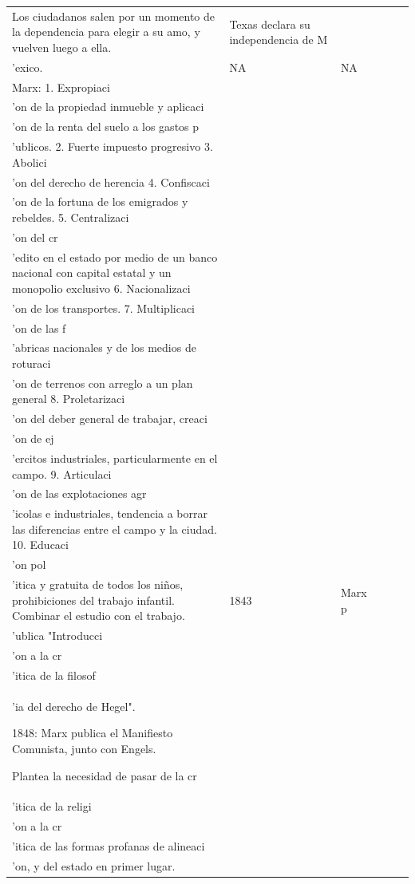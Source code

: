 \documentclass[
  letterpaper,
  DIV=11,
  numbers=noendperiod]{scrreprt}
\begin{document}
\begin{table}
\begin{tabular*}{\linewidth}{@{\extracolsep{\fill}}lllllc}
Los ciudadanos salen por un momento de la dependencia para elegir a su amo, y vuelven luego a ella. & Texas declara su independencia de M\\'exico.  & NA & NA \\ 
Marx:
1. Expropiaci\\'on de la propiedad inmueble y aplicaci\\'on de la renta del suelo a los gastos p\\'ublicos.
2. Fuerte impuesto progresivo
3. Abolici\\'on del derecho de herencia
4. Confiscaci\\'on de la fortuna de los emigrados y rebeldes.
5. Centralizaci\\'on del cr\\'edito en el estado por medio de un banco nacional con capital estatal y un monopolio exclusivo
6. Nacionalizaci\\'on de los transportes.
7. Multiplicaci\\'on de las f\\'abricas nacionales y de los medios de roturaci\\'on de terrenos con arreglo a un plan general
8. Proletarizaci\\'on del deber general de trabajar, creaci\\'on de ej\\'ercitos industriales, particularmente en el campo.
9. Articulaci\\'on de las explotaciones agr\\'icolas e industriales, tendencia a borrar las diferencias entre el campo y la ciudad.
10. Educaci\\'on pol\\'itica y gratuita de todos los ni\~nos, prohibiciones del trabajo infantil. Combinar el estudio con el trabajo. & 1843  & Marx p\\'ublica "Introducci\\'on a la cr\\'itica de la filosof\\'ia del derecho de Hegel".

1848: Marx publica el Manifiesto Comunista, junto con Engels.  

Plantea la necesidad de pasar de la cr\\'itica de la religi\\'on a la cr\\'itica de las formas profanas de alineaci\\'on, y del estado en primer lugar.


\end{tabular*}
\end{table}
\end{document}
